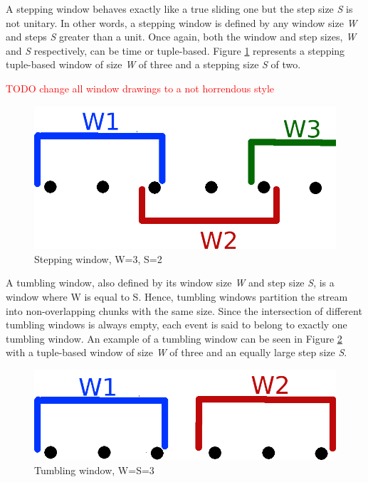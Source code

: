 A stepping window behaves exactly like a true sliding one but the step size \textit{S} is not unitary. In other words, a stepping window is defined by any window size \textit{W} and steps \textit{S} greater than a unit. Once again, both the window and step sizes, \textit{W} and \textit{S} respectively, can be time or tuple-based. Figure \ref{fig:stepping-window} represents a stepping tuple-based window of size \textit{W} of three and a stepping size \textit{S} of two.


\textcolor{red}{TODO change all window drawings to a not horrendous style}

\begin{figure}[!htb]
    \begin{center}
      \includegraphics[scale=0.3]{figures/stepping.png}
      \caption[Stepping window]{Stepping window, W=3, S=2}
      \label{fig:stepping-window}
    \end{center}
\end{figure}

A tumbling window, also defined by its window size \textit{W} and step size \textit{S}, is a window where W is equal to S. Hence, tumbling windows partition the stream into non-overlapping chunks with the same size. Since the intersection of different tumbling windows is always empty, each event is said to belong to exactly one tumbling window. An example of a tumbling window can be seen in Figure \ref{fig:tumbling-window} with a tuple-based window of size \textit{W} of three and an equally large step size \textit{S}.

\begin{figure}[!htb]
    \begin{center}
      \includegraphics[scale=0.3]{figures/tumbling.png}
      \caption[Tumbling window]{Tumbling window, W=S=3}
      \label{fig:tumbling-window}
    \end{center}
\end{figure}

